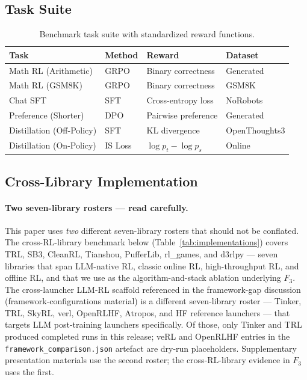 \documentclass{article}
\begin{document}
\subsection{Task Suite}

\begin{table}[htbp]
\centering
\caption{Benchmark task suite with standardized reward functions.}
\label{tab:tasks}
\begin{tabular}{llll}
\toprule
\textbf{Task} & \textbf{Method} & \textbf{Reward} & \textbf{Dataset} \\
\midrule
Math RL (Arithmetic) & GRPO & Binary correctness & Generated \\
Math RL (GSM8K) & GRPO & Binary correctness & GSM8K \\
Chat SFT & SFT & Cross-entropy loss & NoRobots \\
Preference (Shorter) & DPO & Pairwise preference & Generated \\
Distillation (Off-Policy) & SFT & KL divergence & OpenThoughts3 \\
Distillation (On-Policy) & IS Loss & $\log p_t - \log p_s$ & Online \\
\bottomrule
\end{tabular}
\end{table}

\subsection{Cross-Library Implementation}

\paragraph{Two seven-library rosters --- read carefully.}
This paper uses \emph{two} different seven-library rosters that
should not be conflated. The cross-RL-library benchmark below
(Table~\ref{tab:implementations}) covers TRL, SB3, CleanRL, Tianshou,
PufferLib, rl\_games, and d3rlpy --- seven libraries that span
LLM-native RL, classic online RL, high-throughput RL, and offline RL,
and that we use as the algorithm-and-stack ablation underlying $F_3$.
The cross-launcher LLM-RL scaffold referenced in the framework-gap
discussion (framework-configurations material) is a different seven-library
roster --- Tinker, TRL, SkyRL, verl, OpenRLHF, Atropos, and HF
reference launchers --- that targets LLM post-training launchers
specifically. Of those, only Tinker and TRL produced completed
runs in this release; veRL and OpenRLHF entries in the
\texttt{framework\_comparison.json} artefact are dry-run
placeholders. Supplementary presentation materials use the second roster; the
cross-RL-library evidence in $F_3$ uses the first.
\end{document}
